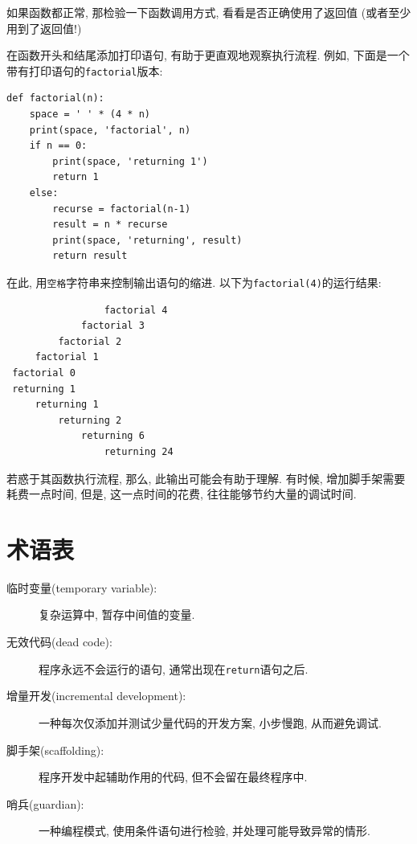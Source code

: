 \documentclass[10pt]{book}
\begin{document}
如果函数都正常, 那检验一下函数调用方式, 看看是否正确使用了返回值
(或者至少用到了返回值!)

在函数开头和结尾添加打印语句, 有助于更直观地观察执行流程. 例如, 下面是一个
带有打印语句的{\tt factorial}版本:

\begin{verbatim}
def factorial(n):
    space = ' ' * (4 * n)
    print(space, 'factorial', n)
    if n == 0:
        print(space, 'returning 1')
        return 1
    else:
        recurse = factorial(n-1)
        result = n * recurse
        print(space, 'returning', result)
        return result
\end{verbatim}
%
在此, 用{\tt 空格}字符串来控制输出语句的缩进. 以下为{\tt factorial(4)}的运行结果:

\begin{verbatim}
                 factorial 4
             factorial 3
         factorial 2
     factorial 1
 factorial 0
 returning 1
     returning 1
         returning 2
             returning 6
                 returning 24
\end{verbatim}
%
若惑于其函数执行流程, 那么, 此输出可能会有助于理解. 
有时候, 增加脚手架需要耗费一点时间, 
但是, 这一点时间的花费, 往往能够节约大量的调试时间. 

\section{术语表}

\begin{description}

\item[临时变量(temporary variable):] 复杂运算中, 暂存中间值的变量. 

\item[无效代码(dead code):]  程序永远不会运行的语句, 通常出现在{\tt return}语句之后. 

\item[增量开发(incremental development):]  一种每次仅添加并测试少量代码的开发方案, 
小步慢跑, 从而避免调试. 

\item[脚手架(scaffolding):]  程序开发中起辅助作用的代码, 但不会留在最终程序中. 

\item[哨兵(guardian):]  一种编程模式, 使用条件语句进行检验, 并处理可能导致异常的情形. 

\end{description}
\end{document}

